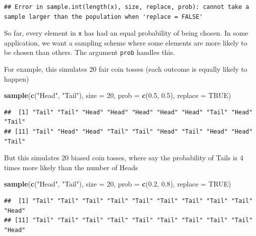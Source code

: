 \documentclass[]{book}
\newenvironment{Shaded}{\begin{snugshade}}{\end{snugshade}}
\newcommand{\KeywordTok}[1]{\textcolor[rgb]{0.13,0.29,0.53}{\textbf{#1}}}
\newcommand{\DataTypeTok}[1]{\textcolor[rgb]{0.13,0.29,0.53}{#1}}
\newcommand{\DecValTok}[1]{\textcolor[rgb]{0.00,0.00,0.81}{#1}}
\newcommand{\FloatTok}[1]{\textcolor[rgb]{0.00,0.00,0.81}{#1}}
\newcommand{\StringTok}[1]{\textcolor[rgb]{0.31,0.60,0.02}{#1}}
\newcommand{\OtherTok}[1]{\textcolor[rgb]{0.56,0.35,0.01}{#1}}
\newcommand{\NormalTok}[1]{#1}
\theoremstyle{definition}
\theoremstyle{definition}
\theoremstyle{definition}
\theoremstyle{remark}
\begin{document}
\begin{verbatim}
## Error in sample.int(length(x), size, replace, prob): cannot take a sample larger than the population when 'replace = FALSE'
\end{verbatim}

So far, every element in \texttt{x} has had an equal probability of
being chosen. In some application, we want a sampling scheme where some
elements are more likely to be chosen than others. The argument
\texttt{prob} handles this.

For example, this simulates 20 fair coin tosses (each outcome is equally
likely to happen)

\begin{Shaded}
\begin{Highlighting}[]
\KeywordTok{sample}\NormalTok{(}\KeywordTok{c}\NormalTok{(}\StringTok{"Head"}\NormalTok{, }\StringTok{"Tail"}\NormalTok{), }\DataTypeTok{size =} \DecValTok{20}\NormalTok{, }\DataTypeTok{prob =} \KeywordTok{c}\NormalTok{(}\FloatTok{0.5}\NormalTok{, }\FloatTok{0.5}\NormalTok{), }\DataTypeTok{replace =} \OtherTok{TRUE}\NormalTok{)}
\end{Highlighting}
\end{Shaded}

\begin{verbatim}
##  [1] "Tail" "Tail" "Head" "Head" "Head" "Head" "Head" "Tail" "Head" "Tail"
## [11] "Tail" "Head" "Head" "Tail" "Tail" "Head" "Tail" "Head" "Head" "Tail"
\end{verbatim}

But this simulates 20 biased coin tosses, where say the probability of
Tails is 4 times more likely than the number of Heads

\begin{Shaded}
\begin{Highlighting}[]
\KeywordTok{sample}\NormalTok{(}\KeywordTok{c}\NormalTok{(}\StringTok{"Head"}\NormalTok{, }\StringTok{"Tail"}\NormalTok{), }\DataTypeTok{size =} \DecValTok{20}\NormalTok{, }\DataTypeTok{prob =} \KeywordTok{c}\NormalTok{(}\FloatTok{0.2}\NormalTok{, }\FloatTok{0.8}\NormalTok{), }\DataTypeTok{replace =} \OtherTok{TRUE}\NormalTok{)}
\end{Highlighting}
\end{Shaded}

\begin{verbatim}
##  [1] "Tail" "Tail" "Tail" "Tail" "Tail" "Tail" "Tail" "Tail" "Tail" "Head"
## [11] "Tail" "Tail" "Tail" "Tail" "Tail" "Tail" "Tail" "Tail" "Tail" "Head"
\end{verbatim}
\end{document}
